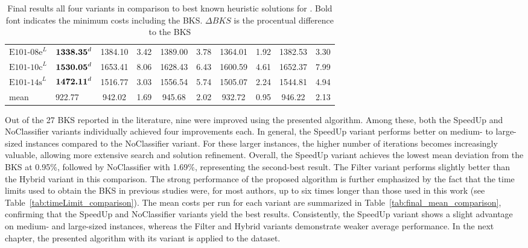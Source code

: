 \begin{table}[ht]
\begin{tabular}{@{}llcccccccc@{}}
        $\text{E101-08e}^L$ & $\text{\textbf{1338.35}}^d$ & 1384.10                          & 3.42                       & 1389.00                     & 3.78                       & 1364.01          & 1.92         & 1382.53         & 3.30         \\
        $\text{E101-10c}^L$ & $\text{\textbf{1530.05}}^d$ & 1653.41                          & 8.06                       & 1628.43                     & 6.43                       & 1600.59          & 4.61         & 1652.37         & 7.99         \\
        $\text{E101-14s}^L$ & $\text{\textbf{1472.11}}^d$ & 1516.77                          & 3.03                       & 1556.54                     & 5.74                       & 1505.07          & 2.24         & 1544.81         & 4.94         \\\midrule
        mean                & 922.77                      & 942.02                           & 1.69                       & 945.68                      & 2.02                       & 932.72           & 0.95         & 946.22          & 2.13         \\
        \bottomrule
    \end{tabular}
    \caption[Final results all four variants in comparison to best known heuristic solutions for \gendreauDataSet]
    {Final results all four variants in comparison to best known heuristic solutions for \gendreauDataSet. Bold font indicates the
        minimum costs including the BKS. $\Delta BKS$ is the procentual difference to the BKS}
    \label{tab:final_best_results_gendreau}
\end{table}

Out of the 27 \gls{BKS} reported in the literature, nine were improved using the presented algorithm. Among these,
both the SpeedUp and NoClassifier variants individually achieved four improvements each. In general, the SpeedUp variant performs
better on medium- to large-sized instances compared to the NoClassifier variant. For these larger instances, the higher number of
iterations becomes increasingly valuable, allowing more extensive search and solution refinement.
Overall, the SpeedUp variant achieves the lowest mean deviation from the \gls{BKS} at 0.95\%, followed by NoClassifier with 1.69\%,
representing the second-best result. The Filter variant performs slightly better than the Hybrid variant in this comparison. The
strong performance of the proposed algorithm is further emphasized by the fact that the time limits used to obtain the \gls{BKS}
in previous studies were, for most authors, up to six times longer than those used in this work (see Table~\ref{tab:timeLimit_comparison}).
The mean costs per run for each variant are summarized in Table~\ref{tab:final_mean_comparison}, confirming that the SpeedUp
and NoClassifier variants yield the best results. Consistently, the SpeedUp variant shows a slight advantage on medium- and large-sized
instances, whereas the Filter and Hybrid variants demonstrate weaker average performance. In the next chapter, the presented
algorithm with its variant is applied to the \krebsADataSetText dataset.
